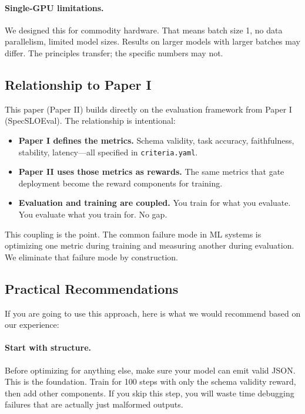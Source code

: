 \documentclass[11pt]{article}
\begin{document}
\paragraph{Single-GPU limitations.}
We designed this for commodity hardware.
That means batch size 1, no data parallelism, limited model sizes.
Results on larger models with larger batches may differ.
The principles transfer; the specific numbers may not.

\subsection{Relationship to Paper I}

This paper (Paper II) builds directly on the evaluation framework from Paper I (SpecSLOEval).
The relationship is intentional:

\begin{itemize}[leftmargin=12pt]
    \item \textbf{Paper I defines the metrics.} Schema validity, task accuracy, faithfulness, stability, latency---all specified in \texttt{criteria.yaml}.
    \item \textbf{Paper II uses those metrics as rewards.} The same metrics that gate deployment become the reward components for training.
    \item \textbf{Evaluation and training are coupled.} You train for what you evaluate. You evaluate what you train for. No gap.
\end{itemize}

This coupling is the point.
The common failure mode in ML systems is optimizing one metric during training and measuring another during evaluation.
We eliminate that failure mode by construction.

\subsection{Practical Recommendations}

If you are going to use this approach, here is what we would recommend based on our experience:

\paragraph{Start with structure.}
Before optimizing for anything else, make sure your model can emit valid JSON.
This is the foundation.
Train for 100 steps with only the schema validity reward, then add other components.
If you skip this step, you will waste time debugging failures that are actually just malformed outputs.
\end{document}
